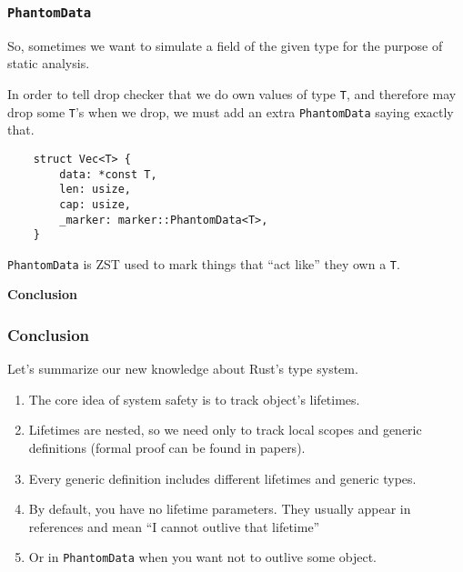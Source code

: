 \documentclass[aspectratio=1610,t]{beamer}
\begin{document}

\begin{frame}[fragile]
\frametitle{\texttt{PhantomData}}
So, sometimes we want to simulate a field of the given type for the purpose of static analysis.

In order to tell drop checker that we do own values of type \texttt{T}, and therefore may drop some \texttt{T}'s when we drop, we must add an extra \texttt{PhantomData} saying exactly that.

\begin{verbatim}
    struct Vec<T> {
        data: *const T,
        len: usize,
        cap: usize,
        _marker: marker::PhantomData<T>,
    }
\end{verbatim}

\texttt{PhantomData} is ZST used to mark things that ``act like'' they own a \texttt{T}.
\end{frame}


\begin{frame}[c]
\centering\Huge\textbf{Conclusion}
\end{frame}


\begin{frame}[fragile]
\frametitle{Conclusion}
Let's summarize our new knowledge about Rust's type system.

\begin{enumerate}
    \item<2-> The core idea of system safety is to track object's lifetimes.
    \item<3-> Lifetimes are nested, so we need only to track local scopes and generic definitions (formal proof can be found in papers).
    \item<4-> Every generic definition includes different lifetimes and generic types.
    \item<5-> By default, you have no lifetime parameters. They usually appear in references and mean ``I cannot outlive that lifetime''
    \item<6-> Or in \texttt{PhantomData} when you want not to outlive some object.
\end{enumerate}
\end{frame}

\end{document}
